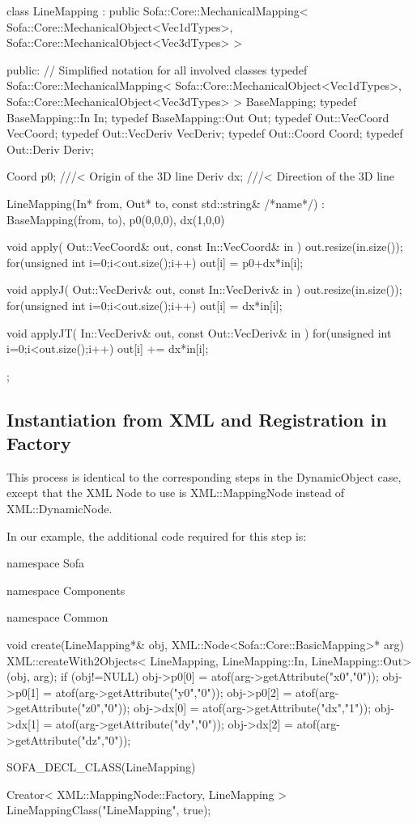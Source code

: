 \begin{code_cpp}
class LineMapping : public Sofa::Core::MechanicalMapping< Sofa::Core::MechanicalObject<Vec1dTypes>, Sofa::Core::MechanicalObject<Vec3dTypes> >
{
public:
  // Simplified notation for all involved classes
  typedef Sofa::Core::MechanicalMapping< Sofa::Core::MechanicalObject<Vec1dTypes>, Sofa::Core::MechanicalObject<Vec3dTypes> > BaseMapping;
  typedef BaseMapping::In In;
  typedef BaseMapping::Out Out;
  typedef Out::VecCoord VecCoord;
  typedef Out::VecDeriv VecDeriv;
  typedef Out::Coord Coord;
  typedef Out::Deriv Deriv;

  Coord p0; ///< Origin of the 3D line
  Deriv dx; ///< Direction of the 3D line
  
  LineMapping(In* from, Out* to, const std::string& /*name*/)
  : BaseMapping(from, to), p0(0,0,0), dx(1,0,0)
  {
  }
  
  void apply( Out::VecCoord& out, const In::VecCoord& in )
  {
    out.resize(in.size());
    for(unsigned int i=0;i<out.size();i++)
      out[i] = p0+dx*in[i];
  }
  
  void applyJ( Out::VecDeriv& out, const In::VecDeriv& in )
  {
    out.resize(in.size());
    for(unsigned int i=0;i<out.size();i++)
      out[i] = dx*in[i];
  }
  
  void applyJT( In::VecDeriv& out, const Out::VecDeriv& in )
  {
    for(unsigned int i=0;i<out.size();i++)
      out[i] += dx*in[i];
  }
};
\end{code_cpp}

\subsection{Instantiation from XML and Registration in Factory}

This process is identical to the corresponding steps in the DynamicObject case, except that the XML Node to use is XML::MappingNode instead of XML::DynamicNode.

In our example, the additional code required for this step is:
\begin{code_cpp}

namespace Sofa { namespace Components { namespace Common {

void create(LineMapping*& obj, XML::Node<Sofa::Core::BasicMapping>* arg)
{
  XML::createWith2Objects< LineMapping, LineMapping::In, LineMapping::Out>(obj, arg);
  if (obj!=NULL)
  {
    obj->p0[0] = atof(arg->getAttribute("x0","0"));
    obj->p0[1] = atof(arg->getAttribute("y0","0"));
    obj->p0[2] = atof(arg->getAttribute("z0","0"));
    obj->dx[0] = atof(arg->getAttribute("dx","1"));
    obj->dx[1] = atof(arg->getAttribute("dy","0"));
    obj->dx[2] = atof(arg->getAttribute("dz","0"));
  }
} } } }

SOFA_DECL_CLASS(LineMapping)

Creator< XML::MappingNode::Factory, LineMapping > LineMappingClass("LineMapping", true);
\end{code_cpp}

